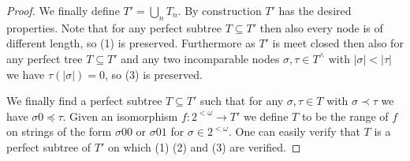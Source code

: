 \begin{proof}
We finally define $T' = \bigcup_n T_n$. By construction $T'$ has the desired properties. Note that for any perfect subtree $T \subseteq T'$ then also every node is of different length, so (1) is preserved. Furthermore as $T'$ is meet closed then also for any perfect tree $T \subseteq T'$ and any two incomparable nodes $\sigma,\tau \in T^{\wedge}$ with $|\sigma| < |\tau|$ we have $\tau(|\sigma|) = 0$, so (3) is preserved.

We finally find a perfect subtree $T \subseteq T'$ such that for any $\sigma,\tau \in T$ with $\sigma \prec \tau$ we have $\sigma0 \preceq \tau$. Given an isomorphism $f:2^{<\omega}  \rightarrow T'$ we define $T$ to be the range of $f$ on strings of the form $\sigma00$ or $\sigma01$ for $\sigma \in 2^{<\omega}$. One can easily verify that $T$ is a perfect subtree of $T'$ on which (1) (2) and (3) are verified.
\end{proof}

